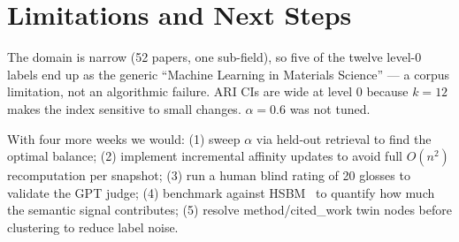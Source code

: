 \documentclass[10pt]{article}
\begin{document}
\section{Limitations and Next Steps}\label{sec:future}

The domain is narrow (52 papers, one sub-field), so five of the twelve level-0
labels end up as the generic ``Machine Learning in Materials Science'' — a corpus
limitation, not an algorithmic failure.
ARI CIs are wide at level 0 because $k=12$ makes the index sensitive to small changes.
$\alpha=0.6$ was not tuned.

With four more weeks we would:
(1) sweep $\alpha$ via held-out retrieval to find the optimal balance;
(2) implement incremental affinity updates to avoid full $O(n^2)$ recomputation
per snapshot;
(3) run a human blind rating of 20 glosses to validate the GPT judge;
(4) benchmark against HSBM~\cite{chodrow2021hypergraph} to quantify how much the
semantic signal contributes;
(5) resolve method/cited\_work twin nodes before clustering to reduce label noise.



\end{document}
